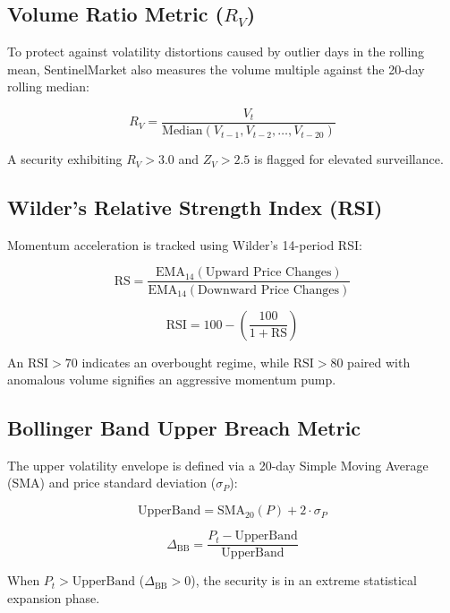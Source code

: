 \subsection{Volume Ratio Metric ($R_V$)}
To protect against volatility distortions caused by outlier days in the rolling mean, SentinelMarket also measures the volume multiple against the 20-day rolling median:

\begin{equation}
R_V = \frac{V_t}{\text{Median}(V_{t-1}, V_{t-2}, \dots, V_{t-20})}
\end{equation}

A security exhibiting $R_V > 3.0$ and $Z_V > 2.5$ is flagged for elevated surveillance.

\subsection{Wilder's Relative Strength Index (RSI)}
Momentum acceleration is tracked using Wilder's 14-period RSI:

\begin{equation}
\text{RS} = \frac{\text{EMA}_{14}(\text{Upward Price Changes})}{\text{EMA}_{14}(\text{Downward Price Changes})}
\end{equation}

\begin{equation}
\text{RSI} = 100 - \left( \frac{100}{1 + \text{RS}} \right)
\end{equation}

An $\text{RSI} > 70$ indicates an overbought regime, while $\text{RSI} > 80$ paired with anomalous volume signifies an aggressive momentum pump.

\subsection{Bollinger Band Upper Breach Metric}
The upper volatility envelope is defined via a 20-day Simple Moving Average (SMA) and price standard deviation ($\sigma_P$):

\begin{equation}
\text{UpperBand} = \text{SMA}_{20}(P) + 2 \cdot \sigma_P
\end{equation}

\begin{equation}
\Delta_{\text{BB}} = \frac{P_t - \text{UpperBand}}{\text{UpperBand}}
\end{equation}

When $P_t > \text{UpperBand}$ ($\Delta_{\text{BB}} > 0$), the security is in an extreme statistical expansion phase.

